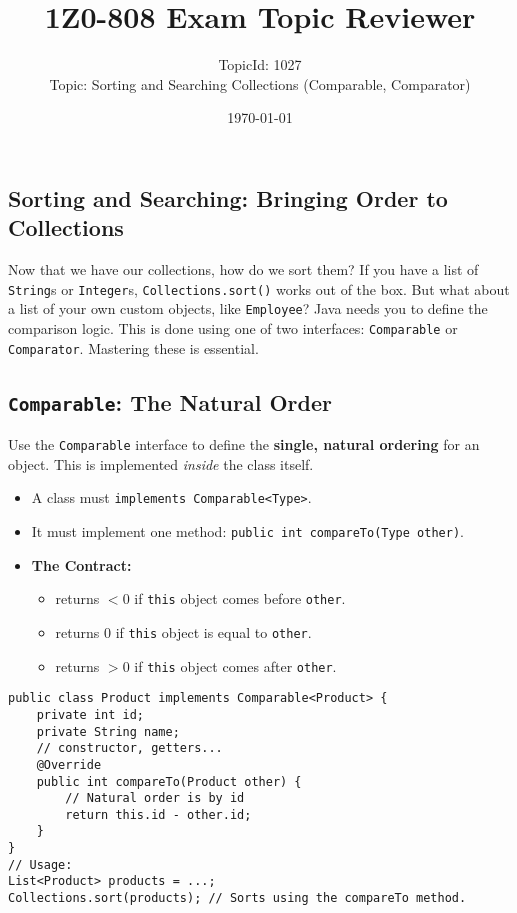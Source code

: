 \documentclass[12pt]{article}
\title{\textbf{1Z0-808 Exam Topic Reviewer}}
\author{TopicId: 1027 \\ Topic: Sorting and Searching Collections (Comparable, Comparator)}
\date{\today}
\begin{document}
\maketitle
\newpage\begin{enumerate}[label=(\arabic*)]
\section*{Sorting and Searching: Bringing Order to Collections}
Now that we have our collections, how do we sort them? If you have a list of \texttt{String}s or \texttt{Integer}s, \texttt{Collections.sort()} works out of the box. But what about a list of your own custom objects, like \texttt{Employee}? Java needs you to define the comparison logic. This is done using one of two interfaces: \texttt{Comparable} or \texttt{Comparator}. Mastering these is essential.

\subsection{\texttt{Comparable}: The Natural Order}
Use the \texttt{Comparable} interface to define the \textbf{single, natural ordering} for an object. This is implemented \textit{inside} the class itself.
\begin{itemize}
    \item A class must \texttt{implements Comparable<Type>}.
    \item It must implement one method: \texttt{public int compareTo(Type other)}.
    \item \textbf{The Contract:} 
        \begin{itemize}
            \item returns $< 0$ if \texttt{this} object comes before \texttt{other}.
            \item returns $0$ if \texttt{this} object is equal to \texttt{other}.
            \item returns $> 0$ if \texttt{this} object comes after \texttt{other}.
        \end{itemize}
\end{itemize}
\begin{verbatim}
public class Product implements Comparable<Product> {
    private int id;
    private String name;
    // constructor, getters...
    @Override
    public int compareTo(Product other) {
        // Natural order is by id
        return this.id - other.id;
    }
}
// Usage:
List<Product> products = ...;
Collections.sort(products); // Sorts using the compareTo method.
\end{verbatim}


\end{enumerate}
\end{document}
